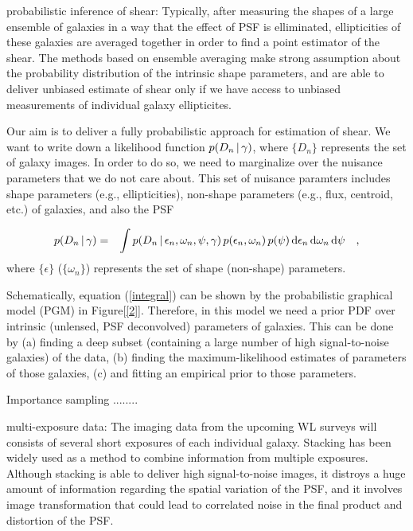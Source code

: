 \documentclass[12pt]{article}
\newcommand{\dd}{\mathrm{d}}
\newcommand{\data}{D}
\newcommand{\intrinsic}{\epsilon}
\newcommand{\shear}{\gamma}
\newcommand{\psf}{\psi}
\begin{document}
probabilistic inference of shear:
Typically, after measuring the shapes
of a large ensemble of galaxies in a way that
the effect of PSF is elliminated, ellipticities
of these galaxies are averaged together in order to
find a point estimator of the shear.
The methods based on ensemble averaging make strong assumption
about the probability distribution of the intrinsic shape parameters,
and are able to deliver unbiased estimate of shear only if we
have access to unbiased measurements of individual galaxy
ellipticites. 

Our aim is to deliver a fully probabilistic approach for estimation of shear.
We want to write down a likelihood function $p(\data_n\given\shear)$, where $\{\data_n\}$
represents the set of galaxy images. In order to do so, we need to marginalize over the
nuisance parameters that we do not care about. This set of nuisance paramters includes 
shape parameters (e.g., ellipticities), non-shape parameters (e.g., flux, centroid, etc.)
of galaxies, and also the PSF

\begin{eqnarray}
p(\data_n\given\shear)
  &=& \int p(\data_n\given\intrinsic_n , \omega_{n}, \psf , \shear)
  \,p(\intrinsic_n, \omega_{n})\,p(\psf)\,\dd\intrinsic_n\,\dd\omega_n\,\dd\psf
  \quad ,
\label{integral}
\end{eqnarray}
where $\{\intrinsic\}$ ($\{\omega_{n}\}$) represents the set of shape
(non-shape) parameters.

Schematically, equation (\ref{integral}) can be shown by the probabilistic
graphical model (PGM) in Figure[\ref{2}]. Therefore, in this model we need
a prior PDF over intrinsic (unlensed, PSF deconvolved) parameters of galaxies.
This can be done by (a) finding a deep subset (containing a large number of high
signal-to-noise galaxies) of the data, (b) finding the maximum-likelihood estimates
of parameters of those galaxies, (c) and fitting an empirical prior to those parameters. 

Importance sampling ........

multi-exposure data:
The imaging data from the upcoming WL surveys will consists of several
short exposures of each individual galaxy. Stacking has been widely used
as a method to combine information from multiple exposures. 
Although stacking is able to deliver high signal-to-noise images, it distroys a
huge amount of information regarding the spatial variation of
the PSF, and it involves image transformation that could lead to correlated noise
in the final product and distortion of the PSF.
\end{document}
